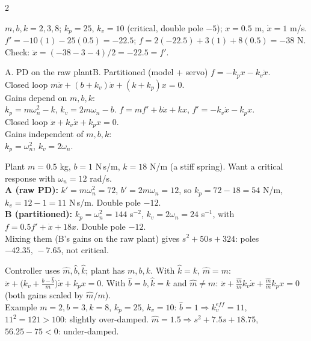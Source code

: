 \begin{multicols}{2}
\begin{recipe}
\begin{enumerate}
\end{enumerate}
\end{recipe}
\begin{worked}
$m,b,k=2,3,8$; $k_p=25$, $k_v=10$ (critical, double pole $-5$); $x=0.5$ m, $\dot x=1$ m/s. $f'=-10(1)-25(0.5)=-22.5$; $f=2(-22.5)+3(1)+8(0.5)=-38$ N. Check: $\ddot x=(-38-3-4)/2=-22.5=f'$. \chk
\end{worked}
\begin{twoway}{A. PD on the raw plant}{B. Partitioned (model + servo)}
$f=-k_px-k_v\dot x$.\\ Closed loop $m\ddot x+(b+k_v)\dot x+(k+k_p)x=0$.\\ Gains depend on $m,b,k$:\\ $k_p=m\omega_n^2-k$, $k_v=2m\omega_n-b$.
\tcblower
$f=mf'+b\dot x+kx$, $f'=-k_v\dot x-k_px$.\\ Closed loop $\ddot x+k_v\dot x+k_px=0$.\\ Gains independent of $m,b,k$:\\ $k_p=\omega_n^2$, $k_v=2\omega_n$.
\end{twoway}
\begin{worked}
Plant $m=0.5$ kg, $b=1$ N\,s/m, $k=18$ N/m (a stiff spring). Want a critical response with $\omega_n=12$ rad/s.\\
\textbf{A (raw PD):} $k'=m\omega_n^2=72$, $b'=2m\omega_n=12$, so $k_p=72-18=54$ N/m, $k_v=12-1=11$ N\,s/m. Double pole $-12$.\\
\textbf{B (partitioned):} $k_p=\omega_n^2=144$ s$^{-2}$, $k_v=2\omega_n=24$ s$^{-1}$, with $f=0.5f'+\dot x+18x$. Double pole $-12$.\\
Mixing them (B's gains on the raw plant) gives $s^2+50s+324$: poles $-42.35,\,-7.65$, not critical. \chk
\end{worked}
\begin{fbx}
Controller uses $\hat m,\hat b,\hat k$; plant has $m,b,k$. With $\hat k=k$, $\hat m=m$: $\ddot x+\big(k_v+\tfrac{b-\hat b}m\big)\dot x+k_px=0$. With $\hat b=b,\hat k=k$ and $\hat m\ne m$: $\ddot x+\tfrac{\hat m}{m}k_v\dot x+\tfrac{\hat m}{m}k_px=0$ (both gains scaled by $\hat m/m$).\\
Example $m=2,b=3,k=8$, $k_p=25$, $k_v=10$: $\hat b=1\Rightarrow k_v^{eff}=11$, $11^2=121>100$: slightly over-damped. $\hat m=1.5\Rightarrow s^2+7.5s+18.75$, $56.25-75<0$: under-damped. \chk
\end{fbx}


\end{multicols}
